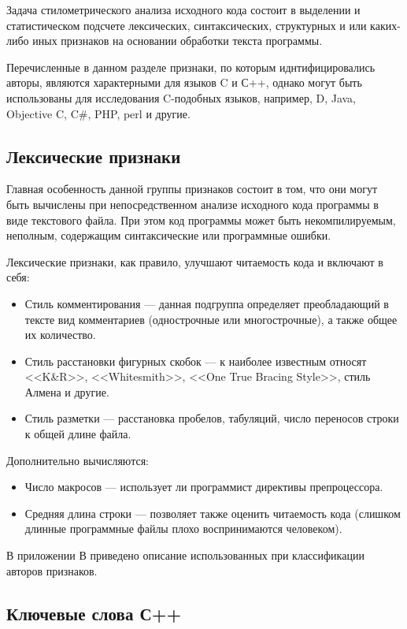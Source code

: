 Задача стилометрического анализа исходного кода состоит в выделении и статистическом подсчете 
лексических, синтаксических, структурных и или каких-либо иных признаков на основании
обработки текста программы.

Перечисленные в данном разделе признаки, по которым иднтифицировались авторы, являются характерными для языков C и С++, однако могут быть 
использованы для исследования C-подобных языков, например, D, Java, Objective C, C\#, PHP, perl и другие.

\subsection{Лексические признаки}

Главная особенность данной группы признаков состоит в том, что они могут быть вычислены при 
непосредственном анализе исходного кода программы в виде текстового файла. 
При этом код программы может быть некомпилируемым, неполным, содержащим
синтаксические или программные ошибки.

Лексические признаки, как правило, улучшают читаемость кода и включают в себя:

\begin{itemize}
 \item Стиль комментирования --- данная подгруппа определяет преобладающий в тексте вид комментариев 
 (однострочные или многострочные), а также общее их количество.
 \item Стиль расстановки фигурных скобок --- к наиболее известным относят <<K\&R>>, <<Whitesmith>>,
 <<One True Bracing Style>>, стиль Алмена и другие.~\cite{bracing_styles} 
 \item Стиль разметки --- расстановка пробелов, табуляций, число переносов строки к общей длине файла.
\end{itemize}


Дополнительно вычисляются:
\begin{itemize}
 \item Число макросов --- использует ли программист директивы препроцессора.\cite{macros}
 \item Средняя длина строки --- позволяет также оценить читаемость кода (слишком длинные программные файлы
 плохо воспринимаются человеком).
\end{itemize}


В приложении В приведено описание использованных при классификации авторов 
признаков.

\subsection{Ключевые слова С++}\label{keycpp}
